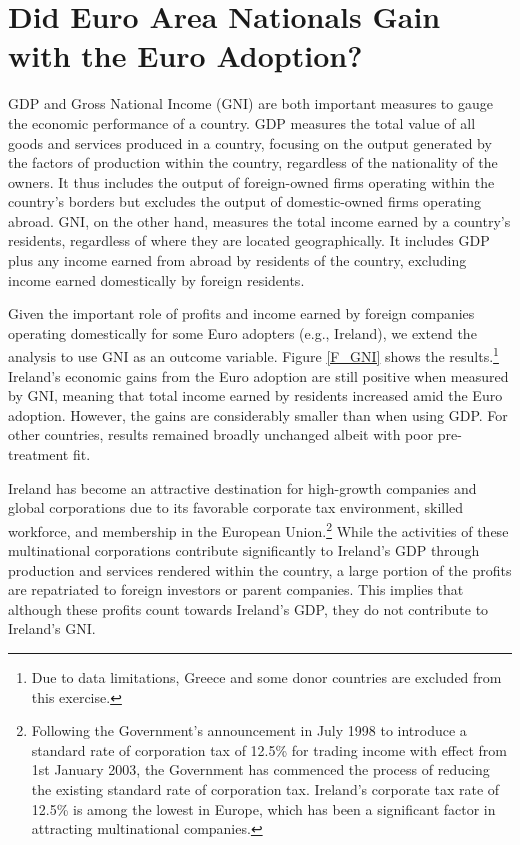\documentclass[12pt]{article}
\begin{document}
\section{Did Euro Area Nationals Gain with the Euro Adoption? \label{S_GNI}}

GDP and Gross National Income (GNI) are both important measures to gauge the economic performance of a country. GDP measures the total value of all goods and services produced in a country, focusing on the output generated by the factors of production within the country, regardless of the nationality of the owners. It thus includes the output of foreign-owned firms operating within the country's borders but excludes the output of domestic-owned firms operating abroad. GNI, on the other hand, measures the total income earned by a country's residents, regardless of where they are located geographically. It includes GDP plus any income earned from abroad by residents of the country, excluding income earned domestically by foreign residents. 

Given the important role of profits and income earned by foreign companies operating domestically for some Euro adopters (e.g., Ireland), we extend the analysis to use GNI as an outcome variable. Figure \ref{F_GNI} shows the results.\footnote{Due to data limitations, Greece and some donor countries are excluded from this exercise.} Ireland's economic gains from the Euro adoption are still positive when measured by GNI, meaning that total income earned by residents increased amid the Euro adoption. However, the gains are considerably smaller than when using GDP. For other countries, results remained broadly unchanged albeit with poor pre-treatment fit. 

Ireland has become an attractive destination for high-growth companies and global corporations due to its favorable corporate tax environment, skilled workforce, and membership in the European Union.\footnote{Following the Government's announcement in July 1998 to introduce a standard rate of corporation tax of 12.5\% for trading income with effect from 1st January 2003, the Government has commenced the process of reducing the existing standard rate of corporation tax. Ireland's corporate tax rate of 12.5\% is among the lowest in Europe, which has been a significant factor in attracting multinational companies.}
While the activities of these multinational corporations contribute significantly to Ireland's GDP through production and services rendered within the country, a large portion of the profits are repatriated to foreign investors or parent companies. This implies that although these profits count towards Ireland's GDP, they do not contribute to Ireland's GNI.
\end{document}
